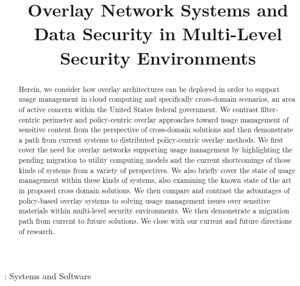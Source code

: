 \documentclass{sig-alternate}
\begin{document}
\title{Overlay Network Systems and Data Security in Multi-Level Security Environments}


\maketitle

\begin{abstract}
Herein,  we consider how overlay architectures can be deployed in order to support usage management in cloud computing and specifically cross-domain scenarios, an area of active concern within the United States federal government.  We contrast filter-centric perimeter and policy-centric overlay approaches toward usage management of sensitive content from the perspective of cross-domain solutions and then demonstrate a path from current systems to distributed policy-centric overlay methods.  We first cover the need for overlay networks supporting usage management by highlighting the pending migration to utility computing models and the current shortcomings of those kinds of systems from a variety of perspectives.  We also briefly cover the state of usage management within these kinds of systems, also examining the known state of the art in proposed cross domain solutions.  We then compare and contrast the advantages of policy-based overlay systems to solving usage management issues over sensitive materials within multi-level security environments. We then demonstrate a migration path from current to future solutions.  We close with our current and future directions of research. 
\end{abstract}

 : {Systems and Software}

\end{document}
